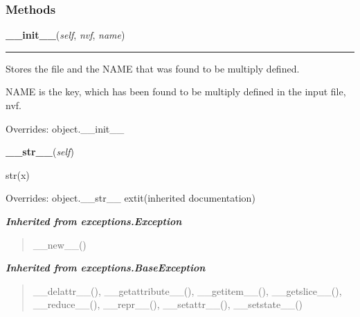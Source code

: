  \subsubsection{Methods}

    \vspace{0.5ex}

\hspace{.8\funcindent}\begin{boxedminipage}{\funcwidth}

    \raggedright \textbf{\_\_init\_\_}(\textit{self}, \textit{nvf}, \textit{name})

    \vspace{-1.5ex}

    \rule{\textwidth}{0.5\fboxrule}
\setlength{\parskip}{2ex}
    Stores the file and the NAME that was found to be multiply defined.

    NAME is the key, which has been found to be multiply defined in the 
    input file, nvf.

\setlength{\parskip}{1ex}
      Overrides: object.\_\_init\_\_

    \end{boxedminipage}

    \vspace{0.5ex}

\hspace{.8\funcindent}\begin{boxedminipage}{\funcwidth}

    \raggedright \textbf{\_\_str\_\_}(\textit{self})

\setlength{\parskip}{2ex}
    str(x)

\setlength{\parskip}{1ex}
      Overrides: object.\_\_str\_\_ 	extit{(inherited documentation)}

    \end{boxedminipage}


\large{\textbf{\textit{Inherited from exceptions.Exception}}}

\begin{quote}
\_\_new\_\_()
\end{quote}

\large{\textbf{\textit{Inherited from exceptions.BaseException}}}

\begin{quote}
\_\_delattr\_\_(), \_\_getattribute\_\_(), \_\_getitem\_\_(), \_\_getslice\_\_(), \_\_reduce\_\_(), \_\_repr\_\_(), \_\_setattr\_\_(), \_\_setstate\_\_()
\end{quote}

